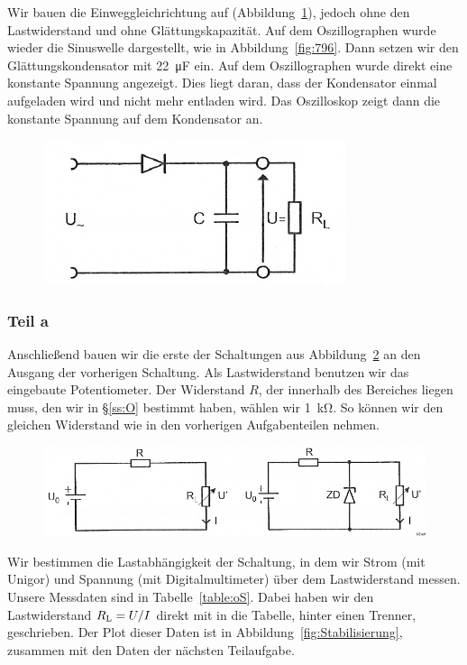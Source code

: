Wir bauen die Einweggleichrichtung auf (Abbildung~\ref{fig:2-8}), jedoch ohne
den Lastwiderstand und ohne Glättungskapazität. Auf dem Oszillographen wurde
wieder die Sinuswelle dargestellt, wie in Abbildung~\ref{fig:796}. Dann setzen
wir den Glättungskondensator mit \SI{22}{\micro\farad} ein. Auf dem
Oszillographen wurde direkt eine konstante Spannung angezeigt. Dies liegt
daran, dass der Kondensator einmal aufgeladen wird und nicht mehr entladen
wird. Das Oszilloskop zeigt dann die konstante Spannung auf dem Kondensator an.

\begin{figure}[htbp]
	\centering
	\caption{%
		\cite[Abbildung~2.8]{physik313-Anleitung}
	}
	\label{fig:2-8}
	\includegraphics[width=.45\linewidth]{Bilder_aus_Anleitung/2-8.png}
\end{figure}

\subsubsection{Teil a}

Anschließend bauen wir die erste der Schaltungen aus Abbildung~\ref{fig:2-11}
an den Ausgang der vorherigen Schaltung. Als Lastwiderstand benutzen wir das
eingebaute Potentiometer. Der Widerstand $R$, der innerhalb des Bereiches
liegen muss, den wir in §\ref{ss:O} bestimmt haben, wählen wir
\SI{1}{\kilo\ohm}. So können wir den gleichen Widerstand wie in den vorherigen
Aufgabenteilen nehmen.

\begin{figure}[htbp]
	\centering
	\caption{%
		\cite[Abbildung~2.11]{physik313-Anleitung}
	}
	\label{fig:2-11}
	\includegraphics[width=\linewidth]{Bilder_aus_Anleitung/2-11.png}
\end{figure}

Wir bestimmen die Lastabhängigkeit der Schaltung, in dem wir Strom (mit
Unigor) und Spannung (mit Digitalmultimeter) über dem Lastwiderstand messen.
Unsere Messdaten sind in Tabelle~\ref{table:oS}. Dabei haben wir den
Lastwiderstand $R_\text L = U / I$ direkt mit in die Tabelle, hinter einen
Trenner, geschrieben. Der Plot dieser Daten ist in
Abbildung~\ref{fig:Stabilisierung}, zusammen mit den Daten der nächsten
Teilaufgabe.


